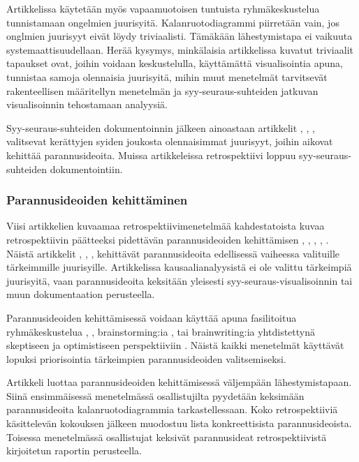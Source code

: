 Artikkelissa \citep{card1998learning} käytetään myös vapaamuotoisen tuntuista ryhmäkeskustelua tunnistamaan ongelmien juurisyitä. Kalanruotodiagrammi piirretään vain, jos onglmien juurisyyt eivät löydy triviaalisti. Tämäkään lähestymistapa ei vaikuuta systemaattisuudellaan. Herää kysymys, minkälaisia artikkelissa kuvatut triviaalit tapaukset ovat, joihin voidaan keskustelulla, käyttämättä visualisointia apuna, tunnistaa samoja olennaisia juurisyitä, mihin muut menetelmät tarvitsevät rakenteellisen määritellyn menetelmän ja syy-seuraus-suhteiden jatkuvan visualisoinnin tehostamaan analyysiä.

Syy-seuraus-suhteiden dokumentoinnin jälkeen ainoastaan artikkelit \citep{card1998learning}, \citep{staalhane2004root}, \citep{karlsson2006case}, \citep{Lehtinen2011} valitsevat kerättyjen syiden joukosta olennaisimmat juurisyyt, joihin aikovat kehittää parannusideoita. Muissa artikkeleissa retrospektiivi loppuu syy-seuraus-suhteiden dokumentointiin.

\subsubsection{Parannusideoiden kehittäminen}

Viisi artikkelien kuvaamaa retrospektiivimenetelmää kahdestatoista kuvaa retrospektiivin päätteeksi pidettävän parannusideoiden kehittämisen \citep{card1998learning}, \citep{staalhane2003post}, \citep{staalhane2004root}, \citep{karlsson2006case}, \citep{Lehtinen2011}. Näistä artikkelit \citep{card1998learning}, \citep{staalhane2004root}, \citep{karlsson2006case}, \citep{Lehtinen2011} kehittävät parannusideoita edellisessä vaiheessa valituille tärkeimmille juurisyille. Artikkelissa \citep{staalhane2003post} kausaalianalyysistä ei ole valittu tärkeimpiä juurisyitä, vaan parannusideoita keksitään yleisesti syy-seuraus-visualisoinnin tai muun dokumentaation perusteella.

Parannusideoiden kehittämisessä voidaan käyttää apuna fasilitoitua ryhmäkeskustelua \citep{card1998learning}, \citep{karlsson2006case}, brainstorming:ia \citep{staalhane2004root}, tai brainwriting:ia yhtdistettynä skeptiseen ja optimistiseen perspektiiviin \citep{Lehtinen2011}. Näistä kaikki menetelmät käyttävät lopuksi priorisointia tärkeimpien parannusideoiden valitsemiseksi. 

Artikkeli \citep{staalhane2003post} luottaa parannusideoiden kehittämisessä väljempään lähestymistapaan. Siinä ensimmäisessä menetelmässä osallistujilta pyydetään keksimään parannusideoita kalanruotodiagrammia tarkastellessaan. Koko retrospektiiviä käsittelevän kokouksen jälkeen muodostuu lista konkreettisista parannusideoista. Toisessa menetelmässä osallistujat keksivät parannusideat retrospektiivistä kirjoitetun raportin perusteella. \citep{staalhane2003post}

